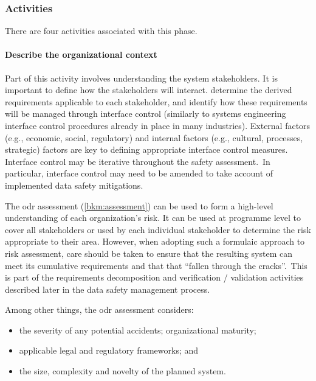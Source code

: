 \subsubsection{Activities}
There are four activities associated with this phase.

\paragraph{Describe the organizational context}
Part of this activity involves understanding the \cbstart system \glspl{stakeholder}\cbend. It is important to define how the \glspl{stakeholder} will interact\cbstart. determine the derived requirements applicable to each \gls{stakeholder}, and identify how these requirements will be managed through interface control (similarly to systems engineering interface control procedures already in place in many industries)\cbend. \cbstart External factors (e.g., economic, social, regulatory) and internal factors (e.g., cultural, processes, strategic) factors are key to defining appropriate interface control measures. Interface control may be iterative throughout the \gls{safety assessment}.\cbend\ In particular, interface control may need to be amended to take account of implemented data safety \glspl{mitigation}.

\cbstart The \gls{odr} assessment (\autoref{bkm:assessment}) can be used to form a high-level understanding of each organization's risk. It can be used at programme level to cover all \glspl{stakeholder} or used by each individual \gls{stakeholder} to determine the
risk appropriate to their area. However, when adopting such a formulaic approach to risk assessment, care should be taken 
to ensure that the resulting system can meet its cumulative requirements and that that ``fallen through the cracks''.\cbend\ This is part of the requirements decomposition and \gls{verification} / \gls{validation} activities described later in the data safety management process.

\cbstart Among other things, the \gls{odr} assessment considers:
\begin{itemize}
	\item the severity of any potential accidents; organizational maturity; 
	\item applicable legal and regulatory frameworks; and 
	\item the size, complexity and novelty of the planned system.
\end{itemize}\cbend\


